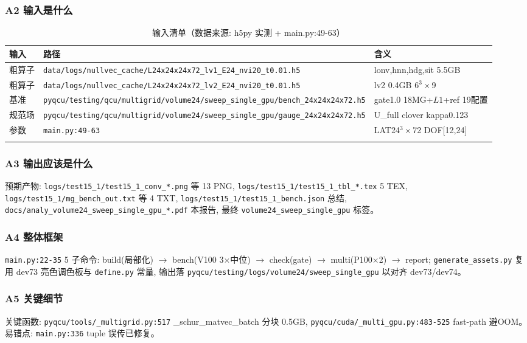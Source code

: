 \documentclass[UTF8]{ctexart}
\begin{document}
\subsubsection{A2 输入是什么}
\begin{xltabular}{\textwidth}{lXl}
\toprule
输入 & 路径 & 含义 \\
\midrule
\endhead
粗算子 & \texttt{\nolinkurl{data/logs/nullvec_cache/L24x24x24x72_lv1_E24_nvi20_t0.01.h5}} & lonv,hnn,hdg,sit 5.5GB \\
粗算子 & \texttt{\nolinkurl{data/logs/nullvec_cache/L24x24x24x72_lv2_E24_nvi20_t0.01.h5}} & lv2 0.4GB 6$^3\times$9 \\
基准 & \texttt{\nolinkurl{pyqcu/testing/qcu/multigrid/volume24/sweep_single_gpu/bench_24x24x24x72.h5}} & gate1.0 18MG+$L1$+ref 19配置 \\
规范场 & \texttt{\nolinkurl{pyqcu/testing/qcu/multigrid/volume24/sweep_single_gpu/gauge_24x24x24x72.h5}} & U\_full clover kappa0.123 \\
参数 & \texttt{\nolinkurl{main.py:49-63}} & LAT24$^3\times$72 DOF[12,24] \\
\bottomrule
\caption{输入清单（数据来源: h5py 实测 + main.py:49-63）}
\end{xltabular}

\subsubsection{A3 输出应该是什么}
预期产物: \texttt{\nolinkurl{logs/test15_1/test15_1_conv_*.png}} 等 13 PNG, \texttt{\nolinkurl{logs/test15_1/test15_1_tbl_*.tex}} 5 TEX, \texttt{\nolinkurl{logs/test15_1/mg_bench_out.txt}} 等 4 TXT, \texttt{\nolinkurl{logs/test15_1/test15_1_bench.json}} 总结, \texttt{\nolinkurl{docs/analy_volume24_sweep_single_gpu_*.pdf}} 本报告, 最终 \texttt{\nolinkurl{volume24_sweep_single_gpu}} 标签。

\subsubsection{A4 整体框架}
\texttt{\nolinkurl{main.py:22-35}} 5 子命令: build(局部化) $\to$ bench(V100 3$\times$中位) $\to$ check(gate) $\to$ multi(P100$\times$2) $\to$ report; \texttt{\nolinkurl{generate_assets.py}} 复用 dev73 亮色调色板与 \texttt{\nolinkurl{define.py}} 常量, 输出落 \texttt{\nolinkurl{pyqcu/testing/logs/volume24/sweep_single_gpu}} 以对齐 dev73/dev74。

\subsubsection{A5 关键细节}
关键函数: \texttt{\nolinkurl{pyqcu/tools/_multigrid.py:517}} \_schur\_matvec\_batch 分块 0.5GB, \texttt{\nolinkurl{pyqcu/cuda/_multi_gpu.py:483-525}} fast-path 避OOM。易错点: \texttt{\nolinkurl{main.py:336}} tuple 误传已修复。

\end{document}
